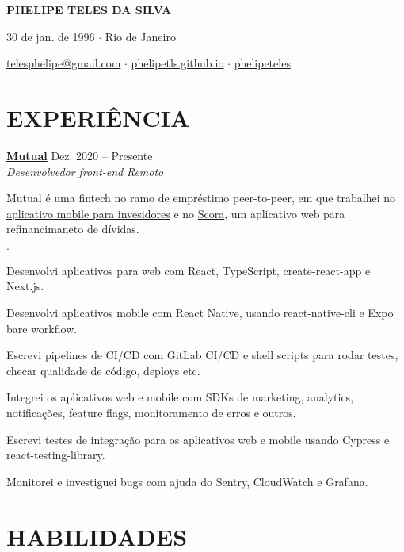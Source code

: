 \documentclass[12pt]{article}
\newenvironment{tightlist}
  {\begin{list}
    {$\cdot$}
    {
      \setlength{\leftmargin}{0em}
      \setlength{\itemsep}{\smallskipamount}
    }
  }
{\end{list}}
\begin{document}
\pagestyle{empty}

\centerline{\huge\bf PHELIPE TELES DA SILVA}
\medskip

\centerline{30 de jan. de 1996 $\cdot$ Rio de Janeiro}
\smallskip

\centerline{
  \href{mailto:telesphelipe@gmail.com}{ telesphelipe@gmail.com}
  $\cdot$
  \href{https://phelipetls.github.io}{ phelipetls.github.io}
  $\cdot$
  \href{https://linkedin.com/in/phelipeteles}{ phelipeteles}
}
\smallskip

\section*{EXPERIÊNCIA}

\textbf{\href{https://mutual.club}{Mutual}} \hfill Dez. 2020 -- Presente \\
\textit{Desenvolvedor front-end} \hfill \textit{Remoto} {\parfillskip=0pt\par}

Mutual é uma fintech no ramo de empréstimo peer-to-peer, em que trabalhei no
\href{https://mutual.club/en/invest.html}{aplicativo mobile para invesidores} e
no \href{https://scora.com.br/}{Scora}, um aplicativo web para refinancimaneto
de dívidas.

\begin{tightlist}
  \item Desenvolvi aplicativos para web com React, TypeScript, create-react-app
    e Next.js.
  \item Desenvolvi aplicativos mobile com React Native, usando react-native-cli
    e Expo bare workflow.
  \item Escrevi pipelines de CI/CD com GitLab CI/CD e shell scripts para rodar
    testes, checar qualidade de código, deploys etc.
  \item Integrei os aplicativos web e mobile com SDKs de marketing, analytics,
    notificações, feature flags, monitoramento de erros e outros.
  \item Escrevi testes de integração para os aplicativos web e mobile usando
    Cypress e react-testing-library.
  \item Monitorei e investiguei bugs com ajuda do Sentry, CloudWatch e Grafana.
\end{tightlist}

\section*{HABILIDADES}
\end{document}
